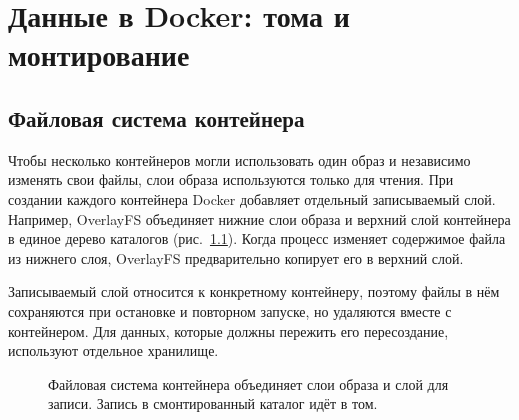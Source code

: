 \chapter{Данные в Docker: тома и монтирование}
\label{ch:21-docker-data}
\begingroup
\setlength{\parskip}{0pt}
\setlength{\parindent}{1.25cm}
\makeatletter
\let\@afterindentfalse\@afterindenttrue
\@afterindenttrue
\makeatother
\setlength{\intextsep}{8pt plus 2pt minus 2pt}
\setlength{\textfloatsep}{10pt plus 2pt minus 2pt}
\raggedbottom
{}
\captionsetup[figure]{font=footnotesize,justification=centering,singlelinecheck=false}

\section{Файловая система контейнера}

Чтобы несколько контейнеров могли использовать один образ и независимо изменять свои файлы, слои образа используются только для чтения. При создании каждого контейнера Docker добавляет отдельный записываемый слой. Например, OverlayFS объединяет нижние слои образа и верхний слой контейнера в единое дерево каталогов (рис.~\ref*{fig:docker-data}). Когда процесс изменяет содержимое файла из нижнего слоя, OverlayFS предварительно копирует его в верхний слой.

Записываемый слой относится к конкретному контейнеру, поэтому файлы в нём сохраняются при остановке и повторном запуске, но удаляются вместе с контейнером. Для данных, которые должны пережить его пересоздание, используют отдельное хранилище.

\begin{figure}[!htb]
  \centering
\caption{Файловая система контейнера объединяет слои образа и слой для записи. Запись в смонтированный каталог идёт в том.}
  \label{fig:docker-data}
\end{figure}

